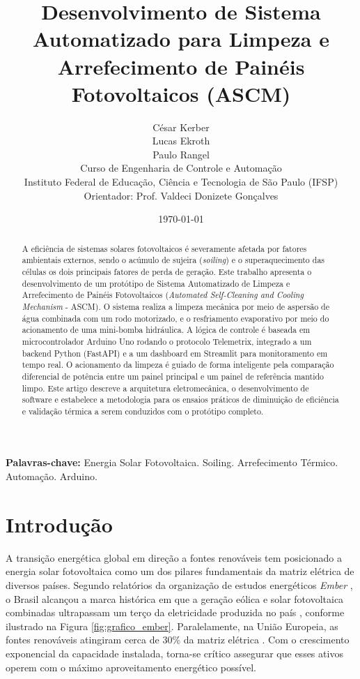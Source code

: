 \documentclass[12pt, a4paper]{article}
\title{
    \vspace{-1.5cm}
    \textbf{Desenvolvimento de Sistema Automatizado para Limpeza e Arrefecimento de Painéis Fotovoltaicos (ASCM)}
}
\author{    
    César Kerber \\
    Lucas Ekroth \\
    Paulo Rangel \\
    \vspace{0.2cm}
    \small Curso de Engenharia de Controle e Automação \\
    \small Instituto Federal de Educação, Ciência e Tecnologia de São Paulo (IFSP) \\
    \small Orientador: Prof. Valdeci Donizete Gonçalves
}
\date{\today}
\begin{document}
\maketitle

\begin{abstract}
\noindent A eficiência de sistemas solares fotovoltaicos é severamente afetada por fatores ambientais externos, sendo o acúmulo de sujeira (\textit{soiling}) e o superaquecimento das células os dois principais fatores de perda de geração. Este trabalho apresenta o desenvolvimento de um protótipo de Sistema Automatizado de Limpeza e Arrefecimento de Painéis Fotovoltaicos (\textit{Automated Self-Cleaning and Cooling Mechanism} - ASCM). O sistema realiza a limpeza mecânica por meio de aspersão de água combinada com um rodo motorizado, e o resfriamento evaporativo por meio do acionamento de uma mini-bomba hidráulica. A lógica de controle é baseada em microcontrolador Arduino Uno rodando o protocolo Telemetrix, integrado a um backend Python (FastAPI) e a um dashboard em Streamlit para monitoramento em tempo real. O acionamento da limpeza é guiado de forma inteligente pela comparação diferencial de potência entre um painel principal e um painel de referência mantido limpo. Este artigo descreve a arquitetura eletromecânica, o desenvolvimento de software e estabelece a metodologia para os ensaios práticos de diminuição de eficiência e validação térmica a serem conduzidos com o protótipo completo.
\end{abstract}

\textbf{Palavras-chave:} Energia Solar Fotovoltaica. Soiling. Arrefecimento Térmico. Automação. Arduino.

\newpage

\section{Introdução}

A transição energética global em direção a fontes renováveis tem posicionado a energia solar fotovoltaica como um dos pilares fundamentais da matriz elétrica de diversos países. Segundo relatórios da organização de estudos energéticos \textit{Ember} \cite{ember_brazil_2024, ember_eu_2026}, o Brasil alcançou a marca histórica em que a geração eólica e solar fotovoltaica combinadas ultrapassam um terço da eletricidade produzida no país \cite{ember_brazil_2024}, conforme ilustrado na Figura \ref{fig:grafico_ember}. Paralelamente, na União Europeia, as fontes renováveis atingiram cerca de 30\% da matriz elétrica \cite{ember_eu_2026}. Com o crescimento exponencial da capacidade instalada, torna-se crítico assegurar que esses ativos operem com o máximo aproveitamento energético possível.
\end{document}
